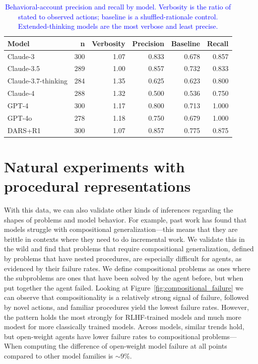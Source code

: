 \documentclass[12pt]{article}
\begin{document}
\begin{table}[H]
\centering\small
\begin{tabular}{lrrrrr}
\toprule
\textbf{Model} & \textbf{n} & \textbf{Verbosity} & \textbf{Precision} & \textbf{Baseline} & \textbf{Recall} \\
\midrule
\rowcolor{claudebg} Claude-3            & 300 & 1.07 & 0.833 & 0.678 & 0.857 \\
\rowcolor{claudebg} Claude-3.5          & 289 & 1.00 & 0.857 & 0.732 & 0.833 \\
\rowcolor{claudebg} Claude-3.7-thinking & 284 & 1.35 & 0.625 & 0.623 & 0.800 \\
\rowcolor{claudebg} Claude-4            & 288 & 1.32 & 0.500 & 0.536 & 0.750 \\
\midrule
\rowcolor{gptbg}    GPT-4               & 300 & 1.17 & 0.800 & 0.713 & 1.000 \\
\rowcolor{gptbg}    GPT-4o              & 278 & 1.18 & 0.750 & 0.679 & 1.000 \\
\midrule
\rowcolor{owbg} DARS+R1 & 300 & 1.07 & 0.857 & 0.775 & 0.875 \\
\bottomrule
\end{tabular}
\caption{\textcolor{blue}{Behavioral-account precision and recall by model. Verbosity is the ratio of stated to observed actions; baseline is a shuffled-rationale control. Extended-thinking models are the most verbose and least precise.}}
\label{tab:verbosity}
\end{table}

\section{Natural experiments with procedural representations}
With this data, we can also validate other kinds of inferences regarding the shapes of problems and model behavior. For example, past work has found that models struggle with compositional generalization---this means that they are brittle in contexts where they need to do incremental work. We validate this in the wild and find that problems that require compositional generalization, defined by problems that have nested procedures, are especially difficult for agents, as evidenced by their failure rates. We define compositional problems as ones where the subproblems are ones that have been solved by the agent before, but when put together the agent failed. Looking at Figure~\ref{fig:compositional_failure} we can observe that compositionality is a relatively strong signal of failure, followed by novel actions, and familiar procedures yield the lowest failure rates. However, the pattern holds the most strongly for RLHF-trained models and much more modest for more classically trained models. Across models, similar trends hold, but open-weight agents have lower failure rates to compositional problems---When computing the difference of open-weight model failure at all points compared to other model families is ${\sim}9\%$.
\end{document}
